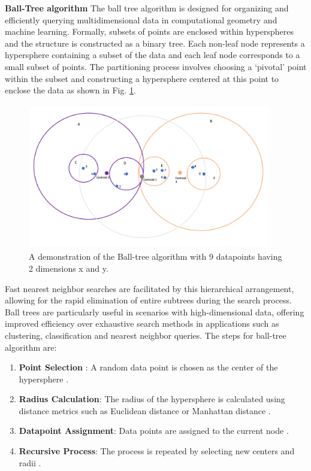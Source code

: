 \textbf{Ball-Tree algorithm}
The ball tree algorithm is designed for organizing and efficiently querying multidimensional data in computational geometry and machine learning. Formally, subsets of points are enclosed within hyperspheres and the structure is constructed as a binary tree. Each non-leaf node represents a hypersphere containing a subset of the data and each leaf node corresponds to a small subset of points. The partitioning process involves choosing a ‘pivotal’ point within the subset and constructing a hypersphere centered at this point to enclose the data as shown in Fig. \ref{fig:ball_tree}.
\begin{figure}[t]
    \centering
    \includegraphics[width=300pt,height=180pt]{pictures/ball_tree.png}
    \caption{A demonstration of the Ball-tree algorithm with 9 datapoints having 2 dimensions x and y.\cite{kd_tree}}
    \label{fig:ball_tree}
\end{figure} 
Fast nearest neighbor searches are facilitated by this hierarchical arrangement, allowing for the rapid elimination of entire subtrees during the search process. Ball trees are particularly useful in scenarios with high-dimensional data, offering improved efficiency over exhaustive search methods in applications such as clustering, classification and nearest neighbor queries. The steps for ball-tree algorithm are:
\begin{enumerate}
    \item \textbf{Point Selection }: A random data point is chosen as the center of the hypersphere \cite{omohundro1989five}.
    \item \textbf{Radius Calculation}: The radius of the hypersphere is calculated using distance metrics such as Euclidean distance or Manhattan distance \cite{omohundro1989five}.
    \item \textbf{Datapoint Assignment}: Data points are assigned to the current node \cite{omohundro1989five}.
    \item \textbf{Recursive Process}: The process is repeated by selecting new centers and radii \cite{omohundro1989five}.
\end{enumerate}
